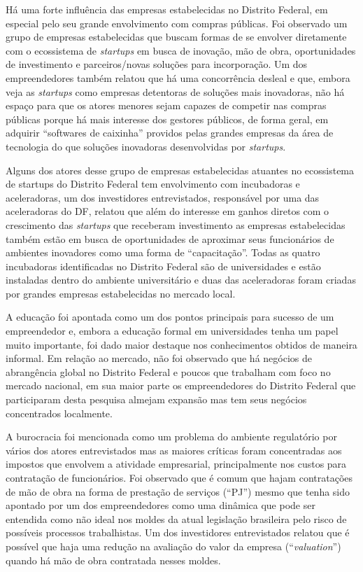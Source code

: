 Há uma forte influência das empresas estabelecidas no Distrito Federal, em especial pelo seu grande envolvimento com compras públicas. Foi observado um grupo de empresas estabelecidas que buscam formas de se envolver diretamente com o ecossistema de \textit{startups} em busca de inovação, mão de obra, oportunidades de investimento e parceiros/novas soluções para incorporação. Um dos empreendedores também relatou que há uma concorrência desleal e que, embora veja as \textit{startups} como empresas detentoras de soluções mais inovadoras, não há espaço para que os atores menores sejam capazes de competir nas compras públicas porque há mais interesse dos gestores públicos, de forma geral, em adquirir ``softwares de caixinha'' providos pelas grandes empresas da área de tecnologia do que soluções inovadoras desenvolvidas por \textit{startups}.

Alguns dos atores desse grupo de empresas estabelecidas atuantes no ecossistema de startups do Distrito Federal tem envolvimento com incubadoras e aceleradoras, um dos investidores entrevistados, responsável por uma das aceleradoras do DF, relatou que além do interesse em ganhos diretos com o crescimento das \textit{startups} que receberam investimento as empresas estabelecidas também estão em busca de oportunidades de aproximar seus funcionários de ambientes inovadores como uma forma de ``capacitação''. Todas as quatro incubadoras identificadas no Distrito Federal são de universidades e estão instaladas dentro do ambiente universitário e duas das aceleradoras foram criadas por grandes empresas estabelecidas no mercado local. 

A educação foi apontada como um dos pontos principais para sucesso de um empreendedor e, embora a educação formal em universidades tenha um papel muito importante, foi dado maior destaque nos conhecimentos obtidos de maneira informal. Em relação ao mercado, não foi observado que há negócios de abrangência global no Distrito Federal e poucos que trabalham com foco no mercado nacional, em sua maior parte os empreendedores do Distrito Federal que participaram desta pesquisa almejam expansão mas tem seus negócios concentrados localmente.

A burocracia foi mencionada como um problema do ambiente regulatório por vários dos atores entrevistados mas as maiores críticas foram concentradas aos impostos que envolvem a atividade empresarial, principalmente nos custos para contratação de funcionários. Foi observado que é comum que hajam contratações de mão de obra na forma de prestação de serviços (``PJ'') mesmo que tenha sido apontado por um dos empreendedores como uma dinâmica que pode ser entendida como não ideal nos moldes da atual legislação brasileira pelo risco de possíveis processos trabalhistas. Um dos investidores entrevistados relatou que é possível que haja uma redução na avaliação do valor da empresa (``\textit{valuation}'') quando há mão de obra contratada nesses moldes.